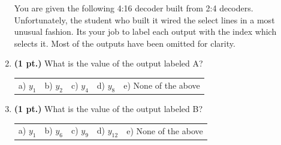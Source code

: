 \documentclass{article}
\begin{document}
\begin{enumerate}
You are given the following 4:16 decoder built from 2:4 decoders.  
Unfortunately, the student who built it wired the select lines in a 
most unusual fashion.  Its your job to label each output with the 
index which selects it.  Most of the outputs have been omitted 
for clarity.


\item {\bf (1 pt.)} What is the value of the output labeled A?

\begin{tabular}{p{0.6in} p{0.6in} p{0.6in} p{0.6in} l}
a) $y_{1}$ & b) $y_{2}$ & c) $y_{4}$ & d) $y_{8}$ & e) None of the above
\end{tabular}

\item {\bf (1 pt.)} What is the value of the output labeled B?

\begin{tabular}{p{0.6in} p{0.6in} p{0.6in} p{0.6in} l}
a) $y_{1}$ & b) $y_{6}$ & c) $y_{9}$ & d) $y_{12}$ & e) None of the above
\end{tabular}


\end{enumerate}
\end{document}
